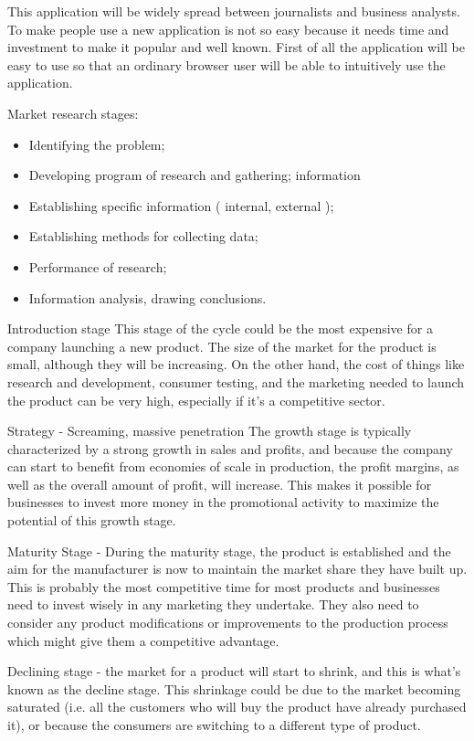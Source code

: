 This application will be widely spread between journalists and business analysts. To make people use a new application is not so easy because it needs time and investment to make it popular and well known. First of all the application will be easy to use so that an ordinary browser user will be able to intuitively use the application.

Market research stages:
\begin{itemize}
 \item Identifying the problem;
 \item Developing program of research and gathering;
information
 \item Establishing specific information ( internal, external );
 \item Establishing methods for collecting data;
 \item Performance of research;
 \item Information analysis, drawing conclusions.
\end{itemize}

Introduction stage This stage of the cycle could be the most expensive for a company launching a new product. The size of the market for the product is small, although they will be increasing. On the other hand, the cost of things like research and development, consumer testing, and the marketing needed to launch the product can be very high, especially if it's a competitive sector.

Strategy - Screaming, massive penetration The growth stage is typically characterized by a strong growth in sales and profits, and because the company can start to benefit from economies of scale in production, the profit margins, as well as the overall amount of profit, will increase. This makes it possible for businesses to invest more money in the promotional activity to maximize the potential of this growth stage.

Maturity Stage - During the maturity stage, the product is established and the aim for the manufacturer is now to maintain the market share they have built up. This is probably the most competitive time for most products and businesses need to invest wisely in any marketing they undertake. They also need to consider any product modifications or improvements to the production process which might give them a competitive advantage.

Declining stage - the market for a product will start to shrink, and this is what's known as the decline stage. This shrinkage could be due to the market becoming saturated (i.e. all the customers who will buy the product have already purchased it), or because the consumers are switching to a different type of product.


